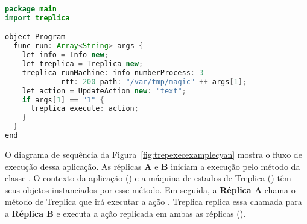 \begin{lstlisting}[language=Java, caption={Configuração e execução de Treplica}, label={cod:TreplicaMain}]
package main
import treplica

object Program
  func run: Array<String> args {
    let info = Info new;
    let treplica = Treplica new;
    treplica runMachine: info numberProcess: 3
             rtt: 200 path: "/var/tmp/magic" ++ args[1];
    let action = UpdateAction new: "text";
    if args[1] == "1" {
      treplica execute: action;
    }
  }
end
\end{lstlisting}

O diagrama de sequência da Figura~\ref{fig:trepexecexamplecyan} mostra o fluxo de execução dessa aplicação. As réplicas \textbf{A} e \textbf{B} iniciam a execução pelo método  da classe . O contexto da aplicação () e a máquina de estados de Treplica () têm seus objetos instanciados por esse método. Em seguida, a \textbf{Réplica A} chama o método  de Treplica que irá executar a ação . Treplica replica essa chamada para a \textbf{Réplica B} e executa a ação replicada em ambas as réplicas ().

